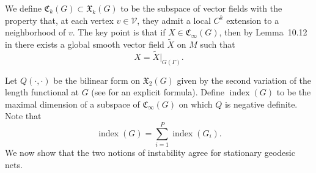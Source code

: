 \documentclass[12pt,english]{article}
\theoremstyle{definition}
\begin{document}
We define $\mathfrak{C}_{k}(G)\subset \mathfrak{X}_k(G)$ to be the subspace of vector fields with the property that, at each vertex $v\in \mathscr{V}$, they admit a local $C^k$ extension to a neighborhood of $v$. The key point is that if $X\in \mathfrak{C}_{\infty}(G)$, then by Lemma~10.12 in \cite{Lee} there exists a global smooth vector field $\tilde{X}$ on $M$ such that
\[
X=\tilde{X}\big|_{G(\Gamma)}.
\]

Let $Q(\cdot,\cdot)$ be the bilinear form on $\mathfrak{X}_2(G)$ given by the second variation of the length functional at $G$ (see \cite{Staffa} for an explicit formula). Define $\operatorname{index}(G)$ to be the maximal dimension of a subspace of $\mathfrak{C}_{\infty}(G)$ on which $Q$ is negative definite. Note that
\[
\operatorname{index}(G)=\sum_{i=1}^{P}\operatorname{index}(G_i).
\]
We now show that the two notions of instability agree for stationary geodesic nets.
\end{document}
